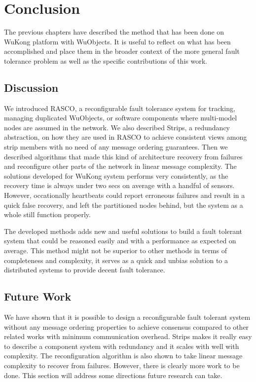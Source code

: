 \cleardoublepage
\singlespacing
\chapter{Conclusion}
\label{c:conclusion}
\doublespacing\nointerlineskip

The previous chapters have described the method that has been done on WuKong platform with WuObjects. It is useful to reflect on what has been accomplished and place them in the broader context of the more general fault tolerance problem as well as the specific contributions of this work.

\section{Discussion}

We introduced RASCO, a reconfigurable fault tolerance system for tracking, 
managing duplicated WuObjects, or software components where multi-model nodes 
are assumed in the network. We also described Strips, a redundancy 
abstraction, on how they are used in RASCO to achieve consistent views 
among strip members with no need of any message ordering guarantees. Then 
we described algorithms that made this kind of architecture recovery from 
failures and reconfigure other parts of the network in linear message 
complexity. The solutions developed for WuKong system performs very consistently, as the recovery time is always under two secs on average with a handful of sensors. However, occationally heartbeats could report erroneous failures and result in a quick false recovery, and left the partitioned nodes behind, but the system as a whole still function properly.

The developed methods adds new and useful solutions to build a fault tolerant system that could be reasoned easily and with a performance as expected on average. This method might not be superior to other methods in terms of completeness and complexity, it serves as a quick and unbias solution to a distributed systems to provide decent fault tolerance.

\section{Future Work}

We have shown that it is possible to design a reconfigurable fault tolerant system without any message ordering properties to achieve consensus compared to other related works with minimum communication overhead. Strips makes it really easy to describe a component system with redundancy and it scales with well with complexity. 
The reconfiguration algorithm is also shown to take linear message complexity to recover from failures. However, there is clearly more work to be done. This section will address some directions future research can take.

